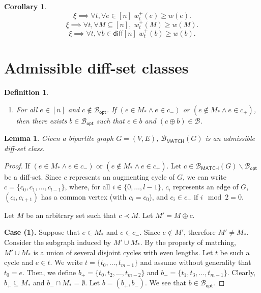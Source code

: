 \documentclass{article}
\newtheorem{define}{Definition}
\newtheorem{lemma}{Lemma}
\newtheorem{corollary}{Corollary}
\newcommand{\diff}{\mathsf{diff}}
\newcommand{\diffvalid}{\prec}
\newcommand{\B}{\mathcal B}
\newcommand{\del}{\backslash}
\newcommand{\Bopt}{\mathcal B_{\mathsf{opt}}}
\newcommand{\Bmatch}{\mathcal B_{\mathsf{MATCH}}}
\begin{document}
\begin{spacing}{1.1}
\begin{corollary}
\label{corr:conf}
$$
\xi \implies \forall t,\forall e\in[n] \; w_t^+(e) \ge w(e).
$$
$$
\xi \implies \forall t,\forall M\subseteq[n],\; w_t^+(M) \ge w(M).
$$
$$
\xi \implies \forall t,\forall b\in\diff[n]\; w_t^+(b) \ge w(b).
$$
\end{corollary}



\section{Admissible diff-set classes}

\begin{define}

\begin{enumerate}
\item For all $e\in[n]$ and $c \not\in \Bopt$. If $(e \in M_* \wedge e\in c_-)$ or $(e \not \in M_* \wedge e\in c_+)$,
then there exists $b\in \Bopt$ such that $e\in b$ and $(c \oplus b) \in \B$.
\end{enumerate}

\end{define}

\begin{lemma}
Given a bipartite graph $G=(V,E)$, $\Bmatch(G)$ is an admissible diff-set class.
\end{lemma}

\begin{proof}
If $(e \in M_* \wedge e\in c_-)$ or $(e \not \in M_* \wedge e\in c_+)$.
Let $c \in \Bmatch(G) \del \Bopt$ be a diff-set.
Since $c$ represents an augmenting cycle of $G$,
we can write 
$c=\{c_0,c_1,\ldots,c_{l-1}\}$, where, for all $i\in\{0,\ldots,l-1\}$,
$c_i$ represents an edge of $G$, $(c_{i},c_{i+1})$ has a common vertex (with $c_l=c_0$), and $c_i \in c_+$ if $i \mod 2=0$.

Let $M$ be an arbitrary set such that $c\diffvalid M$. 
Let $M'=M\oplus c$.

\textbf{Case (1).} Suppose that $e\in M_*$ and $e\in c_-$. 
Since $e\not\in M'$, therefore $M'\not= M_*$.
Consider the subgraph induced by $M'\cup M_*$.
By the property of matching, $M'\cup M_*$ is a union of several disjoint cycles with even lengths.
Let $t$ be such a cycle and $e\in t$.
We write $t=\{t_0,\ldots, t_{m-1}\}$ and assume without generality that $t_0=e$.
Then, we define $b_+=\{t_0,t_2,\ldots,t_{m-2}\}$ and $b_-=\{t_1,t_3,\ldots,t_{m-1}\}$.
Clearly, $b_+\subseteq M_*$ and $b_-\cap M_* = \emptyset$. 
Let $b=(b_+,b_-)$.
We see that $b\in \Bopt$.


\end{proof}
\end{spacing}
\end{document}
